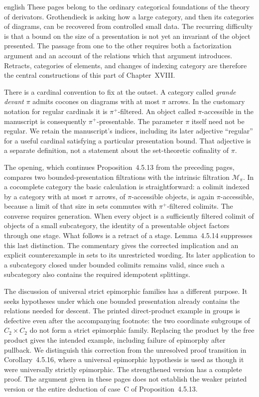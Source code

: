 \begin{otherlanguage*}{english}
These pages belong to the ordinary categorical foundations of the theory of derivators. Grothendieck is asking how a large category, and then its categories of diagrams, can be recovered from controlled small data. The recurring difficulty is that a bound on the size of a presentation is not yet an invariant of the object presented. The passage from one to the other requires both a factorization argument and an account of the relations which that argument introduces. Retracts, categories of elements, and changes of indexing category are therefore the central constructions of this part of Chapter~XVIII.

There is a cardinal convention to fix at the outset. A category called \emph{grande devant $\pi$} admits cocones on diagrams with at most $\pi$ arrows. In the customary notation for regular cardinals it is $\pi^+$-filtered. An object called $\pi$-accessible in the manuscript is consequently $\pi^+$-presentable. The parameter $\pi$ itself need not be regular. We retain the manuscript's indices, including its later adjective ``regular'' for a useful cardinal satisfying a particular presentation bound. That adjective is a separate definition, not a statement about the set-theoretic cofinality of $\pi$.

The opening, which continues Proposition~4.5.13 from the preceding pages, compares two bounded-presentation filtrations with the intrinsic filtration $\mathcal M_\pi$. In a cocomplete category the basic calculation is straightforward: a colimit indexed by a category with at most $\pi$ arrows, of $\pi$-accessible objects, is again $\pi$-accessible, because a limit of that size in sets commutes with $\pi^+$-filtered colimits. The converse requires generation. When every object is a sufficiently filtered colimit of objects of a small subcategory, the identity of a presentable object factors through one stage. What follows is a retract of a stage. Lemma~4.5.14 suppresses this last distinction. The commentary gives the corrected implication and an explicit counterexample in sets to its unrestricted wording. Its later application to a subcategory closed under bounded colimits remains valid, since such a subcategory also contains the required idempotent splittings.

The discussion of universal strict epimorphic families has a different purpose. It seeks hypotheses under which one bounded presentation already contains the relations needed for descent. The printed direct-product example in groups is defective even after the accompanying footnote: the two coordinate subgroups of $C_2\times C_2$ do not form a strict epimorphic family. Replacing the product by the free product gives the intended example, including failure of epimorphy after pullback. We distinguish this correction from the unresolved proof transition in Corollary~4.5.16, where a universal epimorphic hypothesis is used as though it were universally strictly epimorphic. The strengthened version has a complete proof. The argument given in these pages does not establish the weaker printed version or the entire deduction of case~C of Proposition~4.5.13.


\end{otherlanguage*}
